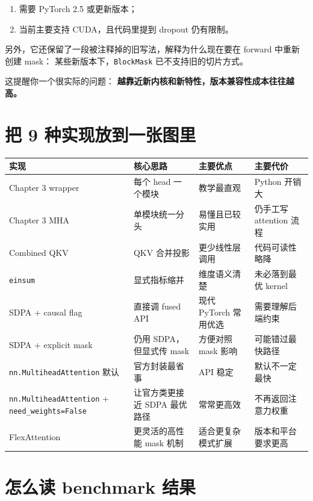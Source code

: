 \documentclass[12pt,a4paper]{ctexart}
\newcommand{\code}[1]{\texttt{#1}}
\begin{document}
\begin{enumerate}
  \item 需要 PyTorch 2.5 或更新版本；
  \item 当前主要支持 CUDA，且代码里提到 dropout 仍有限制。
\end{enumerate}

另外，它还保留了一段被注释掉的旧写法，解释为什么现在要在 forward 中重新创建 mask：
某些新版本下，\code{BlockMask} 已不支持旧的切片方式。

这提醒你一个很实际的问题：
\textbf{越靠近新内核和新特性，版本兼容性成本往往越高。}

\section{把 9 种实现放到一张图里}

\begin{center}
\begin{longtable}{p{3.0cm} p{4.1cm} p{4.3cm} p{2.8cm}}
\toprule
实现 & 核心思路 & 主要优点 & 主要代价 \\
\midrule
Chapter 3 wrapper & 每个 head 一个模块 & 教学最直观 & Python 开销大 \\
Chapter 3 MHA & 单模块统一分头 & 易懂且已较实用 & 仍手工写 attention 流程 \\
Combined QKV & QKV 合并投影 & 更少线性层调用 & 代码可读性略降 \\
\code{einsum} & 显式指标缩并 & 维度语义清楚 & 未必落到最优 kernel \\
SDPA + causal flag & 直接调 fused API & 现代 PyTorch 常用优选 & 需要理解后端约束 \\
SDPA + explicit mask & 仍用 SDPA，但显式传 mask & 方便对照 mask 影响 & 可能错过最快路径 \\
\code{nn.MultiheadAttention} 默认 & 官方封装最省事 & API 稳定 & 默认不一定最快 \\
\code{nn.MultiheadAttention} + \code{need\_weights=False} & 让官方类更接近 SDPA 最优路径 & 常常更高效 & 不再返回注意力权重 \\
FlexAttention & 更灵活的高性能 mask 机制 & 适合更复杂模式扩展 & 版本和平台要求更高 \\
\bottomrule
\end{longtable}
\end{center}

\section{怎么读 benchmark 结果}
\end{document}
